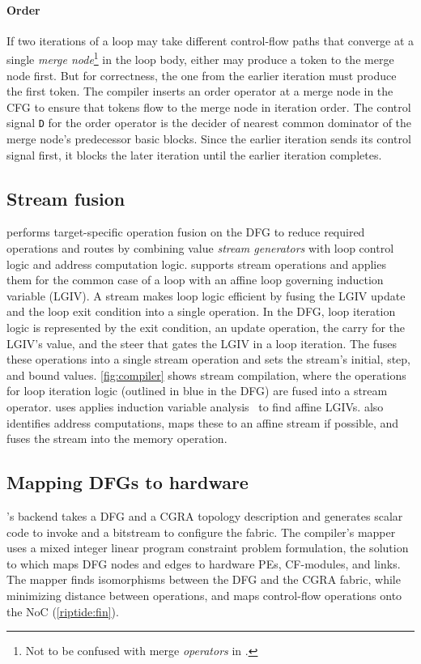 \paragraph{Order}
If two iterations of a loop may take different control-flow
paths that converge at a single {\em merge node}\footnote{Not to be confused with merge \emph{operators} in \riptide.} in the loop body, either may
produce a token to the merge node first.
But for correctness, the one from the
earlier iteration must produce the first token.
%
The compiler inserts an order operator at a merge node in the CFG to ensure that 
tokens flow to the merge node in iteration order.
%
The control signal {\tt D} for the order operator is the decider of
nearest common dominator of the merge node's predecessor basic blocks.
%
%
Since the earlier iteration sends its control signal first, it blocks the later
iteration %
until the earlier iteration completes.
%

\subsection{Stream fusion}

\riptidecomp performs target-specific operation fusion on the DFG to
reduce required operations and routes by combining value {\em stream generators} with loop
control logic and address computation logic.
%
\riptide supports stream operations and applies them for the common case 
of a loop with an affine loop governing induction variable (LGIV).
%
A stream makes loop logic efficient by fusing the LGIV update and the loop
exit condition into a single operation.
%
In the DFG, loop iteration logic is represented by the exit condition, an
update operation, the carry for the LGIV's value, and the steer that
gates the LGIV in a loop iteration.
%
The \mend fuses these operations into a single stream operation and sets
the stream's initial, step, and bound values.
%
\autoref{fig:compiler} shows stream compilation, where
the operations for loop iteration logic (outlined in blue in the 
DFG) are fused into a stream operator.
%
\riptidecomp uses applies induction variable analysis~\cite{dragon,zima-scev} to 
find affine LGIVs.
%
\riptidecomp also identifies address computations, maps these to an affine
stream if possible, and fuses the stream into the memory operation.
%

\subsection{Mapping DFGs to hardware}
\riptidecomp's backend takes a DFG and a CGRA topology description and generates
scalar code to invoke \riptide and a bitstream to configure the \riptide fabric.
% 
The compiler's mapper uses a mixed integer linear program constraint problem formulation, the
solution to which maps DFG nodes and edges to hardware PEs, CF-modules, and
links.
% 
The mapper finds isomorphisms between the DFG and the CGRA fabric, while
minimizing distance between operations, and maps control-flow operations onto
the NoC (\autoref{riptide:fin}).
%